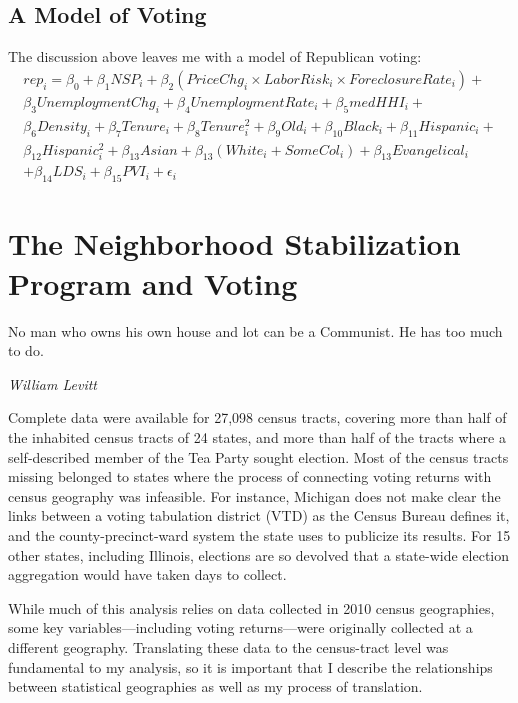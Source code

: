 \documentclass[12pt,oneside]{psthesis}
\begin{document}
\hypertarget{model}{%
\section{A Model of Voting}\label{model}}

The discussion above leaves me with a model of Republican voting:
\begin{multline}
rep_i = \beta_0 + \beta_1NSP_i + \beta_2(PriceChg_i \times LaborRisk_i \times ForeclosureRate_i) + \\ \beta_3UnemploymentChg_i + \beta_4UnemploymentRate_i + \beta_5medHHI_i + \\ \beta_6Density_i +
\beta_7Tenure_i + \beta_8Tenure^2_i + \beta_9Old_i + \beta_{10}Black_i + \beta_{11}Hispanic_i + \\ \beta_{12}Hispanic^2_i + \beta_{13}Asian + \beta_{13}(White_i + SomeCol_i) + \beta_{13}Evangelical_i \\ + \beta_{14}LDS_i + \beta_{15}PVI_i + \epsilon_i
\label{eq:model}
\end{multline}
\hypertarget{outcome}{%
\chapter{The Neighborhood Stabilization Program and Voting}\label{outcome}}

\epigraph{No man who owns his own house and lot can be a Communist. He has too much to do.}{\textit{William Levitt}}

Complete data were available for 27,098 census tracts, covering more than half of the inhabited census tracts of 24 states, and more than half of the tracts where a self-described member of the Tea Party sought election.
Most of the census tracts missing belonged to states where the process of connecting voting returns with census geography was infeasible.
For instance, Michigan does not make clear the links between a voting tabulation district (VTD) as the Census Bureau defines it, and the county-precinct-ward system the state uses to publicize its results.
For 15 other states, including Illinois, elections are so devolved that a state-wide election aggregation would have taken days to collect.

While much of this analysis relies on data collected in 2010 census geographies, some key variables---including voting returns---were originally collected at a different geography.
Translating these data to the census-tract level was fundamental to my analysis, so it is important that I describe the relationships between statistical geographies as well as my process of translation.
\end{document}
